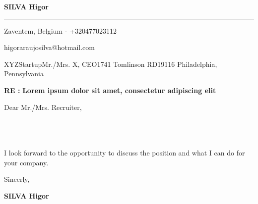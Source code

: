 \documentclass[12pt]{article}
\newcommand{\firstname}{Higor}
\newcommand{\lastname}{Silva}
\newcommand{\mainColor}{redBlood} %
\newlength{\spacebox}
\newcommand{\shspace}{\hspace*{0.8em}}
\newcommand{\xvspace}{\vspace*{0.1em}}
\newcommand{\svspace}{\vspace*{0.5em}}
\newcommand{\mvspace}{\vspace*{1.5em}}
\newcommand{\hvspace}{\vspace*{2.5em}}
\newcommand{\negmvspace}{\vspace*{-1em}}
\newcommand{\userInfo}[4]{
    \begin{flushleft}
        \color{\mainColor}
        \Huge
        \textbf{\MakeUppercase{\lastname}}
        \color{black}
        \textbf{\firstname}
        \color{\mainColor}
        \noindent\rule{19.1cm}{0.8pt}
        \color{grayShy}
        \small
        \par
        \parbox{7\spacebox} {
            \faMap \shspace #1 - #2 \par \svspace
            \faPhone \shspace #3 \par \svspace
            \faEnvelopeOpen \shspace \texttt{#4} \par \svspace
        }
        \color{\mainColor}
        \mvspace
    \end{flushleft}
    \negmvspace
}
\newcommand{\companyInfo}[4]{
    \begin{flushright}
        \parbox{4\spacebox}{
            \raggedleft
            \small
            \textbf{\today}\par
            \xvspace
            \textbf{#1}\par
            \mvspace
            \color{grayShy} \textsc{\MakeLowercase{#2}}\par
            \xvspace
            \textsc{\MakeLowercase{#3}}\par
            \xvspace
            \textsc{\MakeLowercase{#4}}\par 
            \color{black}
        }
    \end{flushright} 
    \hvspace
}
\newcommand{\object}[1]{
    \small
    \color{\mainColor} \textbf{RE :} \color{black} \textbf{#1} \par
}
\newcommand{\content}[2]{
    \mvspace
    \begin{flushleft}
        \parbox{10.3\spacebox}{
          #1\par
          \svspace
          #2
        }\par
    \end{flushleft}
}
\newcommand{\signature}{
    \svspace
    \parbox{3\spacebox}{
      Sincerly,\par
      \svspace \hspace{-0.3em}
      \textbf{\color{\mainColor} \MakeUppercase{\lastname} \color{black} \firstname}\par
      \svspace \svspace
      \Huge \faPenNib\par
    }\par
}
\begin{document}
\selectfont
\userInfo{Zaventem, Belgium}{+320477023112}{higoraraujosilva@hotmail.com}
\companyInfo{XYZStartup}{Mr./Mrs. X, CEO}{1741 Tomlinson RD}{19116 Philadelphia, Pennsylvania}
\object{Lorem ipsum dolor sit amet, consectetur adipiscing elit}
\content{
  Dear Mr./Mrs. Recruiter, \\
  
  \lipsum[1-1] \\

  \lipsum[3-3] \\

  \lipsum[5-5] \\
}{I look forward to the opportunity to discuss the position and what I can do for your company.}
\signature
\end{document}

